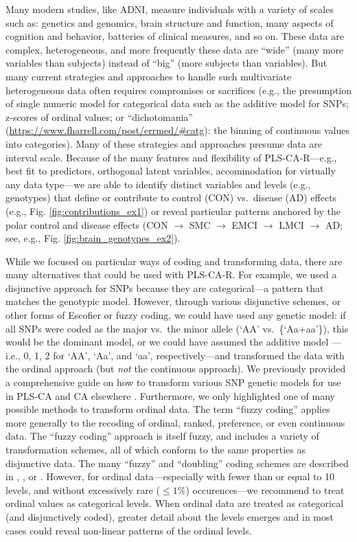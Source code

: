\documentclass[12pt]{article}
\begin{document}
\label{section:Disc}

Many modern studies, like ADNI, measure individuals with a variety of
scales such as: genetics and genomics, brain structure and function,
many aspects of cognition and behavior, batteries of clinical measures,
and so on. These data are complex, heterogeneous, and more frequently
these data are ``wide'' (many more variables than subjects) instead of
``big'' (more subjects than variables). But many current strategies and
approaches to handle such multivariate heterogeneous data often requires
compromises or sacrifices (e.g., the presumption of single numeric model
for categorical data such as the additive model for SNPs; z-scores of
ordinal values; or ``dichotomania''
(\url{https://www.fharrell.com/post/errmed/\#catg}): the binning of
continuous values into categories). Many of these strategies and
approaches presume data are interval scale. Because of the many features
and flexibility of PLS-CA-R---e.g., best fit to predictors, orthogonal
latent variables, accommodation for virtually any data type---we are
able to identify distinct variables and levels (e.g., genotypes) that
define or contribute to control (CON) vs.~disease (AD) effects (e.g.,
Fig. \ref{fig:contributions_ex1}) or reveal particular patterns anchored
by the polar control and disease effects (CON \(\rightarrow\) SMC
\(\rightarrow\) EMCI \(\rightarrow\) LMCI \(\rightarrow\) AD; see, e.g.,
Fig. \ref{fig:brain_genotypes_ex2}).

While we focused on particular ways of coding and transforming data,
there are many alternatives that could be used with PLS-CA-R. For
example, we used a disjunctive approach for SNPs because they are
categorical---a pattern that matches the genotypic model. However,
through various disjunctive schemes, or other forms of Escofier or fuzzy
coding, we could have used any genetic model: if all SNPs were coded as
the major vs.~the minor allele (`AA' vs.~\{`Aa+aa'\}), this would be the
dominant model, or we could have assumed the additive model ---i.e., 0,
1, 2 for `AA', `Aa', and `aa', respectively---and transformed the data
with the ordinal approach (but \emph{not} the continuous approach). We
previously provided a comprehensive guide on how to transform various
SNP genetic models for use in PLS-CA and CA elsewhere \citep[see
Appendix of][]{beaton_partial_2016}. Furthermore, we only highlighted
one of many possible methods to transform ordinal data. The term ``fuzzy
coding'' applies more generally to the recoding of ordinal, ranked,
preference, or even continuous data. The ``fuzzy coding'' approach is
itself fuzzy, and includes a variety of transformation schemes, all of
which conform to the same properties as disjunctive data. The many
``fuzzy'' and ``doubling'' coding schemes are described in
\citet{escofier_traitement_1979}, \citet{lebart_multivariate_1984}, or
\citet{greenacrefuzzy}. However, for ordinal data---especially with
fewer than or equal to 10 levels, and without excessively rare
(\(\leq 1\)\%) occurences---we recommend to treat ordinal values as
categorical levels. When ordinal data are treated as categorical (and
disjunctively coded), greater detail about the levels emerges and in
most cases could reveal non-linear patterns of the ordinal levels.
\end{document}
